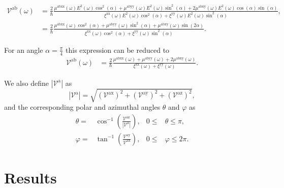 \documentclass[prb,11pt,tightenlines,twocolumn,aps]{revtex4-1}
\begin{document}
\begin{widetext}
\begin{align}
\mathcal{V}^{\mathrm{ab}} (\omega) 
&= \frac{2}{\hbar}
\frac{\mu^{\mathrm{abxx}}(\omega)
E^{2}(\omega)\cos^{2}(\alpha) + 
\mu^{\mathrm{abyy}}(\omega)
E^{2}(\omega)\sin^{2}(\alpha) + 
2\mu^{\mathrm{abxy}}(\omega)
E^{2}(\omega)\cos(\alpha)\sin(\alpha)}
{\xi^{\mathrm{xx}}(\omega)
E^{2}(\omega)\cos^{2}(\alpha) + 
\xi^{\mathrm{yy}}(\omega)
E^{2}(\omega)\sin^{2}(\alpha)},
\nonumber \\
&= \frac{2}{\hbar}
\frac{\mu^{\mathrm{abxx}}(\omega)\cos^{2}(\alpha) + 
\mu^{\mathrm{abyy}}(\omega)\sin^{2}(\alpha) + 
\mu^{\mathrm{abxy}}(\omega)\sin(2\alpha)}
{\xi^{\mathrm{xx}}(\omega)\cos^{2}(\alpha) + 
\xi^{\mathrm{yy}}(\omega)\sin^{2}(\alpha)}.
\label{eq:vab}
\end{align}
\end{widetext}

For an angle $\alpha = \frac{\pi}{4}$ this expression can be reduced to 
\begin{align}
\mathcal{V}^{\mathrm{ab}} (\omega)
&= \frac{2}{\hbar}
\frac{\mu^{\mathrm{abxx}}(\omega) + \mu^{\mathrm{abyy}}(\omega) + 
2\mu^{\mathrm{abxy}}(\omega)}
{\xi^{\mathrm{xx}}(\omega) + \xi^{\mathrm{yy}}(\omega)}.
\label{eq:vab-90deg}
\end{align}

We also define $|\mathcal{V}^{\mathrm{a}}|$ as 
\begin{equation}\label{eq:va-mag}
|\mathcal{V}^{\mathrm{a}}| = 
\sqrt {
(\mathcal{V}^{\mathrm{ax}})^{2} +
(\mathcal{V}^{\mathrm{ay}})^{2} +
(\mathcal{V}^{\mathrm{az}})^{2} 
},
\end{equation}
and the corresponding polar and azimuthal angles $\theta$ and $\varphi$ as
\begin{align}
\theta  =& \cos^{-1} \left( \frac{\mathcal{V}^{\mathrm{az}}}
{|\mathcal{V}^{\mathrm{a}}|} \right),
& 0 \leq &\theta \leq \pi, 
\label{eq:polar-ang}
\\
\varphi =& \tan^{-1} \left( \frac{\mathcal{V}^{\mathrm{ay}}}
{\mathcal{V}^{\mathrm{ax}}} \right),
& 0 \leq &\varphi \leq 2\pi.
\label{eq:azimuthal-ang} 
\end{align}




\section{Results} %
\label{sec:results}
\end{document}
